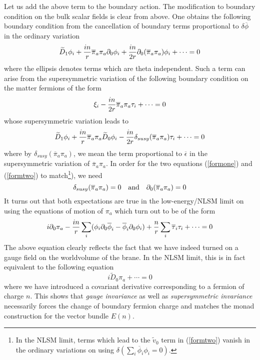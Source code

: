 \documentclass[a4paper,12pt]{article}
\begin{document}
Let us add the above term to the boundary action. The modification to
boundary condition on the bulk scalar fields is clear from above. 
One obtains the following boundary condition
from the cancellation of boundary terms proportional
to $\delta\overline{\phi}$ in the ordinary variation
\begin{equation}
\widetilde{D}_1 \phi_i +
{{in}\over{ r}}\overline{\pi}_a \pi_a  \partial_0\phi_i 
+{{in}\over{2 r}}\partial_0 (\overline{\pi}_a \pi_a)  \phi_i 
+ \cdots =0 \label{formone}
\end{equation}
where the ellipsis denotes terms which are theta independent.
Such a term can arise from the supersymmetric variation of
the following boundary condition on the matter fermions of
the form
\begin{equation}
\xi_i - {{in}\over{2 r}} \overline{\pi}_a\pi_a  \tau_i  + \cdots =0 
\end{equation}
whose supersymmetric variation leads to
\begin{equation}
\widetilde{D}_1 \phi_i +{{in}\over{ r}}\overline{\pi}_a
\pi_a  \widetilde{D}_0\phi_i 
- {{in}\over{2 r}} \delta_{susy}(\overline{\pi}_a\pi_a) \tau_i
+ \cdots =0 \label{formtwo}
\end{equation}
where by $\delta_{susy}(\overline{\pi}_a\pi_a)$, we mean the
term proportional to $\overline{\epsilon}$ in the supersymmetric
variation of $\overline{\pi}_a\pi_a$. In order for the two
equations (\ref{formone}) and (\ref{formtwo}) to match\footnote{In the
NLSM limit, terms which lead to the $\widetilde{v}_0$ term in
(\ref{formtwo}) vanish in the ordinary variations on using
$\delta(\sum_i \overline{\phi}_i\phi_i=0)$.}), we need
$$
\delta_{susy}(\overline{\pi}_a\pi_a)=0\quad{\rm and}\quad
\partial_0(\overline{\pi}_a\pi_a)=0
$$
It turns out that both expectations are true in the low-energy/NLSM limit
on using the equations of motion of $\pi_a$ which turn out
to be of the form
$$
i\partial_0 \pi_a -{{in}\over{ r}}\sum_i (\phi_i
\partial_0\overline{\phi}_i - \overline{\phi}_i
\partial_0 \phi_i) + {n\over{r}} \sum_i\overline{\tau}_i\tau_i + \cdots
=0
$$
The above equation clearly reflects the fact that we have indeed turned
on a gauge field on the worldvolume of the brane. In the NLSM limit,
this is in fact equivalent to  the following equation
$$
i\widetilde{D}_0 \pi_a + \cdots =0
$$
where we have introduced a covariant derivative corresponding to
a fermion of charge $n$. This shows that {\em gauge invariance} as well
as {\em supersymmetric invariance} necessarily  forces the change of
boundary fermion charge and matches the monad construction for
the vector bundle $E(n)$.
\end{document}
